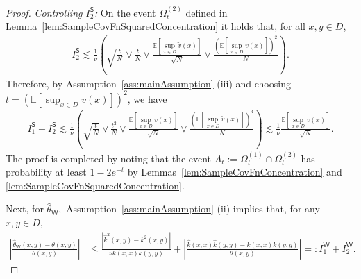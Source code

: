 \documentclass[10pt,a4paper]{amsart}
\newcommand{\E}{\mathbb{E}}
\newcommand{\abs}[1]{\ensuremath{\left\lvert #1 \right\rvert}}
\newcommand{\hatk}{\hat{k}}
\newcommand{\hattheta}{\hat{\theta}}
\newcommand{\inparen}[1]{\left(#1\right)}             %
\newcommand{\tildev}{\tilde{v}}
\begin{document}
\begin{proof}
    
    \textit{Controlling $I^{\mathsf{S}}_2$:} On the event $\Omega_{t}^{(2)}$ defined in Lemma~\ref{lem:SampleCovFnSquaredConcentration} it holds that, for all $x,y \in D$,
    \begin{align*}
        I^{\mathsf{S}}_2 
        \lesssim 
        \frac{1}{\nu} 
        \inparen{
        \sqrt{\frac{t}{N}} \lor \frac{t}{N} \lor \frac{\E[\sup_{x\in D} \tildev(x)]}{\sqrt{N}} \lor \frac{(\E[\sup_{x\in D} \tildev(x)])^2}{N}}.
    \end{align*}
    Therefore, by Assumption~\ref{ass:mainAssumption} (iii) and choosing $t = (\E[\sup_{x\in D} \tildev (x)])^2$, we have
    \begin{align*}
        I^{\mathsf{S}}_1 + I^{\mathsf{S}}_2 \lesssim 
        \frac{1}{\nu} 
        \inparen{
        \sqrt{\frac{t}{N}} \lor \frac{t^2}{N} \lor \frac{\E[\sup_{x\in D} \tildev(x)]}{\sqrt{N}} \lor \frac{(\E[\sup_{x\in D} \tildev(x)])^4}{N}
        }
        \lesssim
        \frac{1}{\nu} \frac{\E[\sup_{x\in D} \tildev(x)]}{\sqrt{N}}.
    \end{align*}
    The proof is completed by noting that the event $A_t := \Omega_{t}^{(1)} \cap \Omega_{t}^{(2)}$ has probability at least $1-2e^{-t}$ by Lemmas~\ref{lem:SampleCovFnConcentration} and \ref{lem:SampleCovFnSquaredConcentration}.

    Next, for $\hattheta_{\mathsf{W}},$ Assumption~\ref{ass:mainAssumption} (ii) implies that, for any $x,y \in D,$
    \begin{align*}
        \abs{
        \frac{\hattheta_{\mathsf{W}}(x,y)-\theta(x,y)
        }{\theta(x,y)}
        }
        &\le 
        \frac{|\hatk^2(x,y) - k^2(x,y)|}{\nu k(x,x)k(y,y)}
        +
        \abs{
        \frac{\hatk(x,x)\hatk(y,y) - k(x,x)k(y,y) 
        }{\theta(x,y)}} 
        =: I^{\mathsf{W}}_1 + I^{\mathsf{W}}_2.
    \end{align*}



\end{proof}
\end{document}
